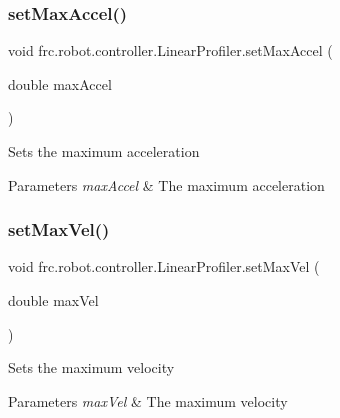 \subsubsection{\texorpdfstring{setMaxAccel()}{setMaxAccel()}}
{\footnotesize\ttfamily void frc.\+robot.\+controller.\+Linear\+Profiler.\+set\+Max\+Accel (\begin{DoxyParamCaption}\item[{double}]{max\+Accel }\end{DoxyParamCaption})\hspace{0.3cm}{\ttfamily [inline]}}

Sets the maximum acceleration


\begin{DoxyParams}{Parameters}
{\em max\+Accel} & The maximum acceleration \\
\hline
\end{DoxyParams}
\mbox{\label{classfrc_1_1robot_1_1controller_1_1_linear_profiler_a4c9134a6d34c837608dd45bbef48ef85}} 
\subsubsection{\texorpdfstring{setMaxVel()}{setMaxVel()}}
{\footnotesize\ttfamily void frc.\+robot.\+controller.\+Linear\+Profiler.\+set\+Max\+Vel (\begin{DoxyParamCaption}\item[{double}]{max\+Vel }\end{DoxyParamCaption})\hspace{0.3cm}{\ttfamily [inline]}}

Sets the maximum velocity


\begin{DoxyParams}{Parameters}
{\em max\+Vel} & The maximum velocity \\
\hline
\end{DoxyParams}
\mbox{\label{classfrc_1_1robot_1_1controller_1_1_linear_profiler_a166c2d4dce639d17bff63776a54cd981}} 
